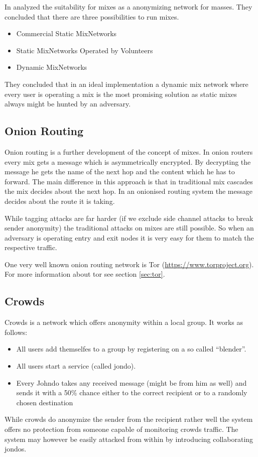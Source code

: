 In \citeyear{RP03-1} \citeauthor{RP03-1} analyzed the suitability for mixes as a anonymizing network for masses. They concluded that there are three possibilities to run mixes.
\begin{itemize}
	\item Commercial Static MixNetworks
	\item Static MixNetworks Operated by Volunteers
	\item Dynamic MixNetworks
\end{itemize}
They concluded that in an ideal implementation a dynamic mix network where every user is operating a mix is the most promising solution as static mixes always might be hunted by an adversary.

\subsection{Onion Routing}
Onion routing is a further development of the concept of mixes. In onion routers every mix gets a message which is asymmetrically encrypted. By decrypting the message he gets the name of the next hop and the content which he has to forward. The main difference in this approach is that in traditional mix cascades the mix decides about the next hop. In an onionised routing system the message decides about the route it is taking. 

While tagging attacks are far harder (if we exclude side channel attacks to break sender anonymity) the traditional attacks on mixes are still possible. So when an adversary is operating entry and exit nodes it is very easy for them to match the respective traffic.

One very well known onion routing network is Tor (\href{https://www.torproject.org}{https://www.torproject.org}). For more information about tor see section \ref{sec:tor}.

\subsection{Crowds}
Crowds is a network which offers anonymity within a local group. It works as follows:
\begin{itemize}
	\item All users add themselfes to a group by registering on a so called ``blender''.
	\item All users start a service (called jondo).
	\item Every Johndo takes any received message (might be from him as well) and sends it with a 50\% chance either to the correct recipient or to a randomly chosen destination
\end{itemize}
While crowds do anonymize the sender from the recipient rather well the system offers no protection from someone capable of monitoring crowds traffic. The system may however be easily attacked from within by introducing collaborating jondos. 

